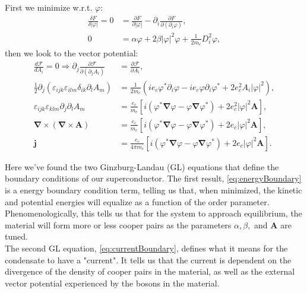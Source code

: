 \documentclass[10pt,twoside]{report}
\numberwithin{equation}{chapter}
\begin{document}
First we minimize w.r.t. $\varphi$:
\begin{align}
  \frac{\delta F}{\delta|\varphi|} = 0 &= \frac{\partial F}{\partial |\varphi|} - \partial_{i}\frac{\partial F}{\partial (\partial_{i}\varphi)}, \nonumber\\
  0 &= \alpha\varphi + 2 \beta|\varphi|^{2}\varphi + \frac{1}{2m_{c}}D_{i}^{2}\varphi, \label{eq:energyBoundary}
\end{align}
then we look to the vector potential:
\begin{align}
  \frac{d \mathcal{F}}{dA_{i}} = 0 \Rightarrow \partial_{j}\frac{\partial \mathcal{F}}{\partial \left( \partial_{j}A_{i} \right)} &= \frac{\partial \mathcal{F}}{\partial A_{i}}, \nonumber\\
  \frac{1}{2}\partial_{j}(\varepsilon_{ijk}\varepsilon_{ilm}\delta_{ik}\partial_{l}A_{m}) &= \frac{1}{2m_{c}}(ie_{c}\varphi^{*}\partial_{i}\varphi-ie_{c}\varphi \partial_{i}\varphi^{*}+2e_{c}^{2}A_{i}|\varphi|^{2}), \nonumber\\
  \varepsilon_{ijk}\varepsilon_{klm}\partial_{j}\partial_{l}A_{m} &= \frac{e_{c}}{m_{c}}\left[ i(\varphi^{*}\bm{\nabla } \varphi - \varphi \bm{\nabla } \varphi^{*}) + 2e^{2}_{c}|\varphi|^{2}\bm{A} \right], \nonumber\\
 \bm{\nabla } \times \left( \bm{\nabla } \times \bm{A} \right) &= \frac{e_{c}}{m_{c}}\left[ i(\varphi^{*}\bm{\nabla } \varphi - \varphi \bm{\nabla } \varphi^{*}) + 2e_{c}|\varphi|^{2}\bm{A} \right], \nonumber \\
 \bm{j} &= \frac{e_{c}}{4\pi m_{c}}\left[ i(\varphi^{*}\bm{\nabla } \varphi - \varphi \bm{\nabla } \varphi^{*}) + 2e_{c}|\varphi|^{2}\bm{A} \right]. \label{eq:currentBoundary}
\end{align}

Here we've found the two Ginzburg-Landau (GL) equations that define the boundary conditions of our superconductor.  The first result, \cref{eq:energyBoundary} is a energy boundary condition term, telling us that, when minimized, the kinetic and potential energies will equalize as a function of the order parameter.  Phenomenologically, this tells us that for the system to approach equilibrium, the material will form more or less cooper pairs as the parameters $\alpha, \beta,$ and $\bm{A}$ are tuned. \\

The second GL equation, \cref{eq:currentBoundary}, defines what it means for the condensate to have a "current".  It tells us that the current is dependent on the divergence of the density of cooper pairs in the material, as well as the external vector potential experienced by the bosons in the material. \\
\end{document}
